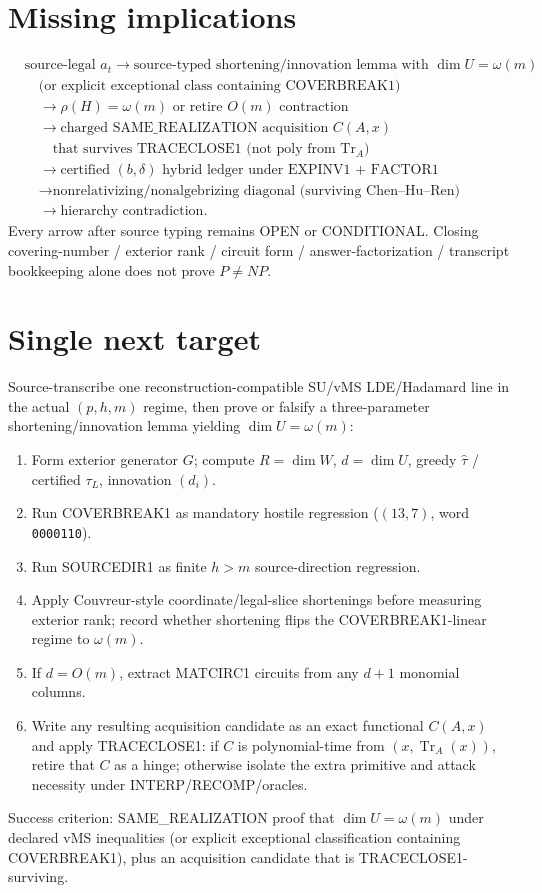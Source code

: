 \documentclass[11pt]{article}
\begin{document}
\section*{Missing implications}
\[
\begin{aligned}
&\text{source-legal }a_t
\to\text{source-typed shortening/innovation lemma with }\dim U=\omega(m)\\
&\quad\text{(or explicit exceptional class containing COVERBREAK1)}\\
&\quad\to\rho(H)=\omega(m)\text{ or retire }O(m)\text{ contraction}\\
&\quad\to\text{charged SAME\_REALIZATION acquisition }C(A,x)\\
&\quad\quad\text{that survives TRACECLOSE1 (not poly from }\operatorname{Tr}_A\text{)}\\
&\quad\to\text{certified }(b,\delta)\text{ hybrid ledger under EXPINV1 + FACTOR1}\\
&\quad\to\text{nonrelativizing/nonalgebrizing diagonal (surviving Chen--Hu--Ren)}\\
&\quad\to\text{hierarchy contradiction}.
\end{aligned}
\]
Every arrow after source typing remains OPEN or CONDITIONAL. Closing covering-number / exterior
rank / circuit form / answer-factorization / transcript bookkeeping alone does not prove $P\neq NP$.

\section*{Single next target}
Source-transcribe one reconstruction-compatible SU/vMS LDE/Hadamard line in the actual $(p,h,m)$
regime, then prove or falsify a three-parameter shortening/innovation lemma yielding
$\dim U=\omega(m)$:
\begin{enumerate}
\item Form exterior generator $G$; compute $R=\dim W$, $d=\dim U$, greedy $\widehat\tau$ /
certified $\tau_L$, innovation $(d_i)$.
\item Run COVERBREAK1 as mandatory hostile regression ($(13,7)$, word \texttt{0000110}).
\item Run SOURCEDIR1 as finite $h>m$ source-direction regression.
\item Apply Couvreur-style coordinate/legal-slice shortenings before measuring exterior rank;
record whether shortening flips the COVERBREAK1-linear regime to $\omega(m)$.
\item If $d=O(m)$, extract MATCIRC1 circuits from any $d+1$ monomial columns.
\item Write any resulting acquisition candidate as an exact functional $C(A,x)$ and apply
TRACECLOSE1: if $C$ is polynomial-time from $(x,\operatorname{Tr}_A(x))$, retire that $C$ as a
hinge; otherwise isolate the extra primitive and attack necessity under INTERP/RECOMP/oracles.
\end{enumerate}
Success criterion: SAME\_REALIZATION proof that $\dim U=\omega(m)$ under declared vMS
inequalities (or explicit exceptional classification containing COVERBREAK1), plus an acquisition
candidate that is TRACECLOSE1-surviving.
\end{document}
